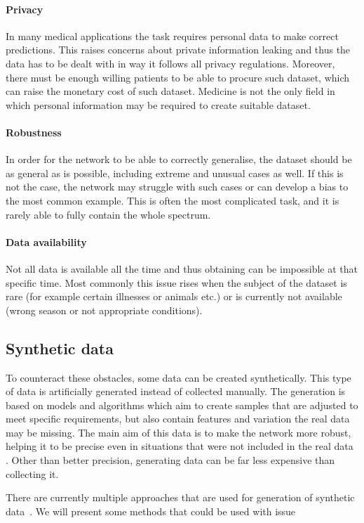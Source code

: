 \paragraph{Privacy} In many medical applications the task requires personal data to make correct predictions. This raises concerns about private information leaking and thus the data has to be dealt with in way it follows all privacy regulations. Moreover, there must be enough willing patients to be able to procure such dataset, which can raise the monetary cost of such dataset. Medicine is not the only field in which personal information may be required to create suitable dataset.
\paragraph{Robustness} In order for the network to be able to correctly generalise, the dataset should be as general as is possible, including extreme and unusual cases as well. If this is not the case, the network may struggle with such cases or can develop a bias to the most common example. This is often the most complicated task, and it is rarely able to fully contain the whole spectrum.
\paragraph{Data availability} Not all data is available all the time and thus obtaining can be impossible at that specific time. Most commonly this issue rises when the subject of the dataset is rare (for example certain illnesses or animals etc.) or is currently not available (wrong season or not appropriate conditions).

\subsection{Synthetic data}
To counteract these obstacles, some data can be created synthetically. This type of data is artificially generated instead of collected manually. The generation is based on models and algorithms which aim to create samples that are adjusted to meet specific requirements, but also contain features and variation the real data may be missing. The main aim of this data is to make the network more robust, helping it to be precise even in situations that were not included in the real data \cite{synthDataRobust}. Other than better precision, generating data can be far less expensive than collecting it. 

There are currently multiple approaches that are used for generation of synthetic data~\cite{synthDataReview}. We will present some methods that could be used with issue


